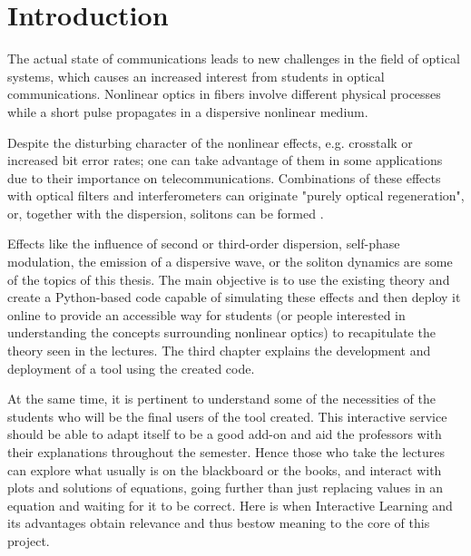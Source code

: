 \chapter{Introduction}

The actual state of communications leads to new challenges in the field of optical systems, which causes an increased interest from students in optical communications. Nonlinear optics in fibers involve different physical processes while a short pulse propagates in a dispersive nonlinear medium. 

Despite the disturbing character of the nonlinear effects, e.g. crosstalk or increased bit error rates; one can take advantage of them in some applications due to their importance on telecommunications. Combinations of these effects with optical filters and interferometers can originate "purely optical regeneration",  or, together with the dispersion, solitons can be formed \cite{rein}.


Effects like the influence of second or third-order dispersion, self-phase modulation, the emission of a dispersive wave, or the soliton dynamics are some of the topics of this thesis. The main objective is to use the existing theory and create a Python-based code capable of simulating these effects and then deploy it online to provide an accessible way for students (or people interested in understanding the concepts surrounding nonlinear optics) to recapitulate the theory seen in the lectures. The third chapter explains the development and deployment of a tool using the created code. 

At the same time, it is pertinent to understand some of the necessities of the students who will be the final users of the tool created. This interactive service should be able to adapt itself to be a good add-on and aid the professors with their explanations throughout the semester. Hence those who take the lectures can explore what usually is on the blackboard or the books, and interact with plots and solutions of equations, going further than just replacing values in an equation and waiting for it to be correct. Here is when Interactive Learning and its advantages obtain relevance and thus bestow meaning to the core of this project.

